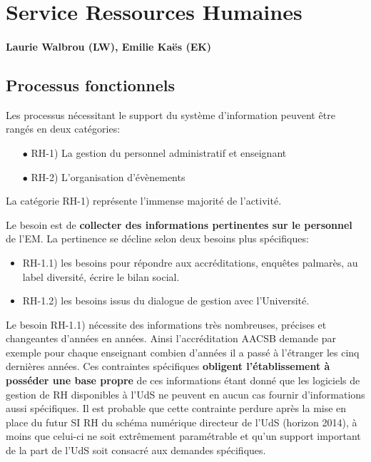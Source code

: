 \documentclass{book}
\begin{document}
	


\section{Service Ressources Humaines}

\paragraph{Laurie Walbrou (LW), Emilie Kaës (EK)}


\subsection{Processus fonctionnels}
\label{sc:rh-process}
Les processus nécessitant le support du système d'information peuvent 
être rangés en deux catégories:
\begin{itemize}
\item[$\bullet$] RH-1) La gestion du personnel administratif et enseignant
\item[$\bullet$] RH-2) L'organisation d'évènements
\end{itemize}
\bigskip

La catégorie RH-1) représente l'immense majorité de l'activité.

Le besoin est de \textbf{collecter des informations pertinentes
sur le personnel} de l'EM. La pertinence se décline selon
deux besoins plus spécifiques:
\begin{itemize}
\item RH-1.1) les besoins pour répondre aux accréditations, enquêtes 
	palmarès, au label diversité, écrire le bilan social.
\item RH-1.2) les besoins issus du dialogue de gestion avec l'Université.
\end{itemize}

\bigskip

Le besoin RH-1.1) nécessite des informations très nombreuses, précises
et changeantes d'années en années. Ainsi l'accréditation AACSB demande
par exemple pour chaque enseignant combien d'années il a passé à l'étranger 
les cinq dernières années. Ces contraintes spécifiques \textbf{obligent 
l'établissement à posséder une base propre} de ces informations étant donné 
que les logiciels de gestion de RH disponibles à l'UdS ne peuvent en aucun
cas fournir d'informations aussi spécifiques. Il est probable que cette
contrainte perdure après la mise en place du futur SI RH du schéma numérique
directeur de l'UdS (horizon 2014), à moins que celui-ci ne soit extrêmement 
paramétrable et qu'un support important de la part de l'UdS soit consacré 
aux demandes spécifiques.\\
\end{document}
